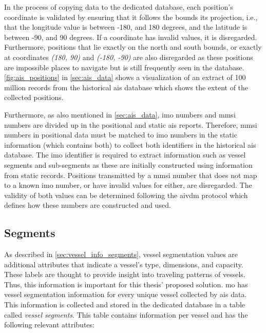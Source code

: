 In the process of copying data to the dedicated database, each position's coordinate is validated by ensuring that it follows the bounds its projection, i.e., that the longitude value is between -180, and 180 degrees, and the latitude is between -90, and 90 degrees. If a coordinate has invalid values, it is disregarded. Furthermore, positions that lie exactly on the north and south bounds, or exactly at coordinates \textit{(180, 90)} and \textit{(-180, -90)} are also disregarded as these positions are impossible places to navigate but is still frequently seen in the database. \cref{fig:ais_positions} in \cref{sec:ais_data} shows a visualization of an extract of 100 million records from the historical \acrshort{ais} database which shows the extent of the collected positions.

Furthermore, as also mentioned in \cref{sec:ais_data}, \acrshort{imo} numbers and \acrshort{mmsi} numbers are divided up in the positional and static \acrshort{ais} reports. Therefore, \acrshort{mmsi} numbers in positional data must be matched to \acrshort{imo} numbers in the static information (which contains both) to collect both identifiers in the historical \acrshort{ais} database. The \acrshort{imo} identifier is required to extract information such as vessel segments and sub-segments as these are initially constructed using information from static records. Positions transmitted by a \acrshort{mmsi} number that does not map to a known \acrshort{imo} number, or have invalid values for either, are disregarded. The validity of both values can be determined following the \gls{aivdm} protocol which defines how these numbers are constructed and used.

\subsection{Segments}

As described in \cref{sec:vessel_info_segments}, vessel segmentation values are additional attributes that indicate a vessel's type, dimensions, and capacity. These labels are thought to provide insight into traveling patterns of vessels. Thus, this information is important for this thesis' proposed solution. \acrshort{mo} has vessel segmentation information for every unique vessel collected by \acrshort{ais} data. This information is collected and stored in the dedicated database in a table called \textit{vessel segments}. This table contains information per vessel and has the following relevant attributes:


